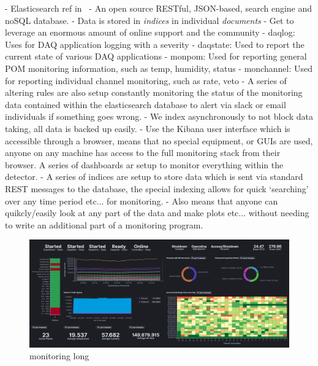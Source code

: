 - Elasticsearch ref in~\cite{elastic2020}
- An open source RESTful, JSON-based, search engine and noSQL database.
- Data is stored in \emph{indices} in individual \emph{documents}
- Get to leverage an enormous amount of online support and the community
- daqlog: Uses for DAQ application logging with a severity
- daqstate: Used to report the current state of various DAQ applications
- monpom: Used for reporting general POM monitoring information, such as temp, humidity, status
- monchannel: Used for reporting individual channel monitoring, such as rate, veto
- A series of altering rules are also setup constantly monitoring the status of the monitoring
data contained within the elasticsearch database to alert via slack or email individuals if something goes wrong.
- We index asynchronously to not block data taking, all data is backed up easily.
- Use the Kibana user interface which is accessible through a browser, means that no special
equipment, or GUIs are used, anyone on any machine has access to the full monitoring stack from
their browser. A series of dashboards ar setup to monitor everything within the detector.
- A series of indices are setup to store data which is sent via standard REST messages to the
database, the special indexing allows for quick `searching' over any time period etc... for
monitoring.
- Also means that anyone can quikcly/easily look at any part of the data and make plots etc...
without needing to write an additional part of a monitoring program.


\begin{figure} %
    \includegraphics[width=\textwidth]{diagrams/5-daq/monitoring.png}
    \caption[monitoring short]
    {monitoring long}
    \label{fig:monitoring}
\end{figure}